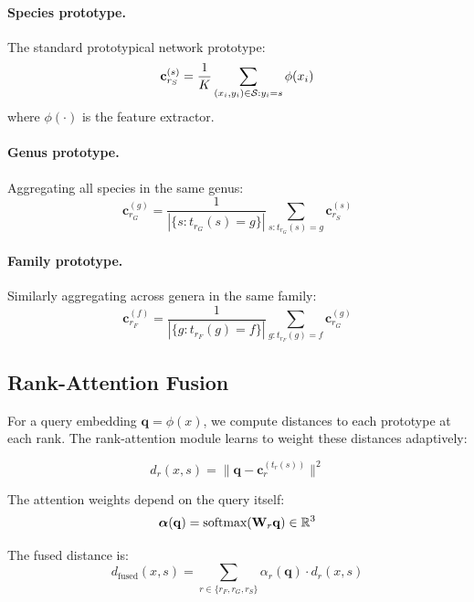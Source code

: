 \paragraph{Species prototype.} The standard prototypical network
prototype:
\begin{equation}
  \mathbf{c}_{r_S}^{(s)} = \frac{1}{K} \sum_{(x_i, y_i) \in
  \mathcal{S} : y_i = s} \phi(x_i)
  \label{eq:species_proto}
\end{equation}
where $\phi(\cdot)$ is the feature extractor.

\paragraph{Genus prototype.} Aggregating all species in the same genus:
\begin{equation}
  \mathbf{c}_{r_G}^{(g)} = \frac{1}{|\{s : t_{r_G}(s) = g\}|}
  \sum_{s : t_{r_G}(s) = g} \mathbf{c}_{r_S}^{(s)}
\end{equation}

\paragraph{Family prototype.} Similarly aggregating across genera in
the same family:
\begin{equation}
  \mathbf{c}_{r_F}^{(f)} = \frac{1}{|\{g : t_{r_F}(g) = f\}|}
  \sum_{g : t_{r_F}(g) = f} \mathbf{c}_{r_G}^{(g)}
\end{equation}

\subsection{Rank-Attention Fusion}

For a query embedding $\mathbf{q} = \phi(x)$, we compute distances to
each prototype at each rank. The rank-attention module learns to weight
these distances adaptively:

\begin{equation}
  d_r(x, s) = \|\mathbf{q} - \mathbf{c}_r^{(t_r(s))}\|^2
\end{equation}

The attention weights depend on the query itself:
\begin{equation}
  \boldsymbol{\alpha}(\mathbf{q}) = \text{softmax}(\mathbf{W}_r
  \mathbf{q}) \in \mathbb{R}^3
\end{equation}

The fused distance is:
\begin{equation}
  d_{\text{fused}}(x, s) = \sum_{r \in \{r_F, r_G, r_S\}}
  \alpha_r(\mathbf{q}) \cdot d_r(x, s)
\end{equation}


